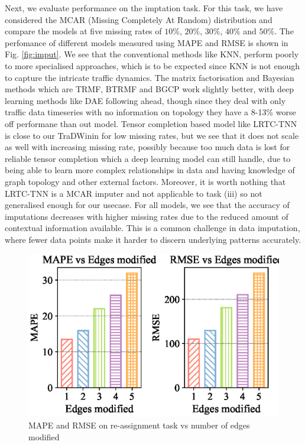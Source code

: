 \documentclass[conference]{IEEEtran}
\newcommand{\name}{TraDWin}
\begin{document}
Next, we evaluate performance on the imptation task. For this task, we have considered the MCAR (Missing Completely At Random) distribution and compare the models at five missing rates of $10\%$, $20\%$, $30\%$, $40\%$ and $50\%$. The perfomance of different models measured using MAPE and RMSE is shown in Fig. \ref{fig:imput}. We see that the conventional methods like KNN, perform poorly to more specialised approaches, which is to be expected since KNN is not enough to capture the intricate traffic dynamics. The matrix factorisation and Bayesian methods which are TRMF, BTRMF and BGCP work slightly better, with deep learning methods like DAE following ahead, though since they deal with only traffic data timeseries with no information on topology they have a 8-13\% worse off performane than out model. Tensor completion based model like LRTC-TNN is close to our \name in for low missing rates, but we see that it does not scale as well with increasing missing rate, possibly because too much data is lost for reliable tensor completion which a deep learning model can still handle, due to being able to learn more complex relationships in data and having knowledge of graph topology and other external factors. Moreover, it is worth nothing that LRTC-TNN is a MCAR imputer and not applicable to task (iii) so not generalised enough for our usecase. For all models, we see that the accuracy of imputations decreases with higher missing rates due to the reduced amount of contextual information available. This is a common challenge in data imputation, where fewer data points make it harder to discern underlying patterns accurately. 


\begin{figure}[t]
    \centering
    \includegraphics[width=\linewidth]{modif.eps}
    \caption{MAPE and RMSE on re-assignment task vs number of edges modified}
    \label{fig:edge_modif}
\end{figure}
\end{document}
